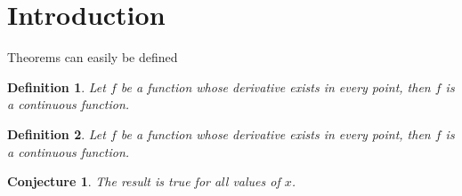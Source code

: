\documentclass{article}
\newtheorem{definition}{Definition}
\newtheorem{conjecture}{Conjecture}
\begin{document}
\section{Introduction}
Theorems can easily be defined

\begin{definition}
	\label{def:label1}
	Let $f$ be a function whose derivative exists in every point, then $f$ is a continuous function.
\end{definition}
 
\begin{definition} %
	\label{def:label2}
	Let $f$ be a function whose derivative exists in every point, then $f$ is a continuous function.
\end{definition}



\begin{conjecture}
	\label{conjecture:1}
	The result is true for all values of $x$.
\end{conjecture}
\end{document}
